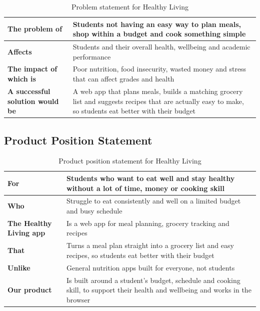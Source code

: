 \documentclass[10pt,letterpaper]{article}
\begin{document}
\begin{table}[h!]
\centering
\caption{Problem statement for Healthy Living}
\label{tab:problem-statement}
\begin{tabularx}{\textwidth}{|>{\bfseries}p{}|X|}
\hline
The problem of & Students not having an easy way to plan meals, shop within a budget and cook something simple \\
\hline
Affects & Students and their overall health, wellbeing and academic performance \\
\hline
The impact of which is & Poor nutrition, food insecurity, wasted money and stress that can affect grades and health \\
\hline
A successful solution would be & A web app that plans meals, builds a matching grocery list and suggests recipes that are actually easy to make, so students eat better with their budget\\
\hline
\end{tabularx}
\end{table}

\subsection{Product Position Statement}

\begin{table}[h!]
\centering
\caption{Product position statement for Healthy Living}
\label{tab:product-position}
\begin{tabularx}{\textwidth}{|>{\bfseries}p{}|X|}
\hline
For & Students who want to eat well and stay healthy without a lot of time, money or cooking skill \\
\hline
Who & Struggle to eat consistently and well on a limited budget and busy schedule \\
\hline
The Healthy Living app & Is a web app for meal planning, grocery tracking and recipes \\
\hline
That & Turns a meal plan straight into a grocery list and easy recipes, so students eat better with their budget\\
\hline
Unlike & General nutrition apps built for everyone, not students \\
\hline
Our product & Is built around a student's budget, schedule and cooking skill, to support their health and wellbeing and works in the browser\\
\hline
\end{tabularx}
\end{table}
\end{document}
